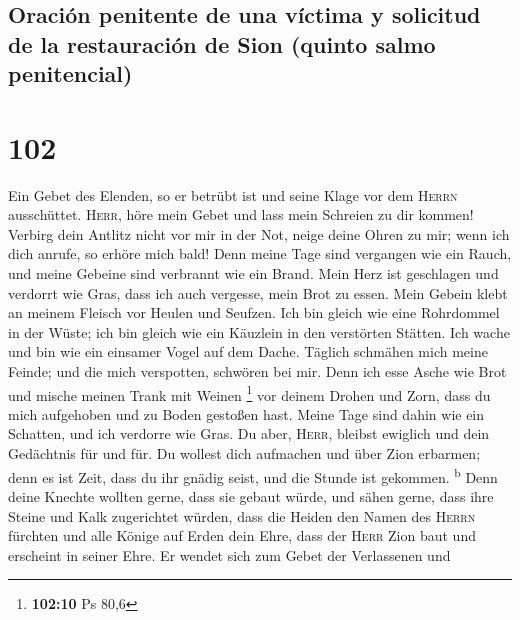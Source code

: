 \hypertarget{oraciuxf3n-penitente-de-una-vuxedctima-y-solicitud-de-la-restauraciuxf3n-de-sion-quinto-salmo-penitencial}{%
\subsection{Oración penitente de una víctima y solicitud de la
restauración de Sion (quinto salmo
penitencial)}\label{oraciuxf3n-penitente-de-una-vuxedctima-y-solicitud-de-la-restauraciuxf3n-de-sion-quinto-salmo-penitencial}}

\hypertarget{section-101}{%
\section{102}\label{section-101}}

 Ein Gebet des Elenden, so er betrübt ist und seine Klage
vor dem \textsc{Herrn} ausschüttet.  \textsc{Herr}, höre
mein Gebet und lass mein Schreien zu dir kommen!  Verbirg
dein Antlitz nicht vor mir in der Not, neige deine Ohren zu mir; wenn
ich dich anrufe, so erhöre mich bald!  Denn meine Tage
sind vergangen wie ein Rauch, und meine Gebeine sind verbrannt wie ein
Brand.  Mein Herz ist geschlagen und verdorrt wie Gras,
dass ich auch vergesse, mein Brot zu essen.  Mein Gebein
klebt an meinem Fleisch vor Heulen und Seufzen.  Ich bin
gleich wie eine Rohrdommel in der Wüste; ich bin gleich wie ein Käuzlein
in den verstörten Stätten.  Ich wache und bin wie ein
einsamer Vogel auf dem Dache.  Täglich schmähen mich meine
Feinde; und die mich verspotten, schwören bei mir.  Denn
ich esse Asche wie Brot und mische meinen Trank mit Weinen \footnote{\textbf{102:10}
  Ps 80,6}  vor deinem Drohen und Zorn, dass du mich
aufgehoben und zu Boden gestoßen hast.  Meine Tage sind
dahin wie ein Schatten, und ich verdorre wie Gras.  Du
aber, \textsc{Herr}, bleibst ewiglich und dein Gedächtnis für und für.
 Du wollest dich aufmachen und über Zion erbarmen; denn
es ist Zeit, dass du ihr gnädig seist, und die Stunde ist gekommen.
\textsuperscript{b}  Denn deine Knechte wollten gerne,
dass sie gebaut würde, und sähen gerne, dass ihre Steine und Kalk
zugerichtet würden,  dass die Heiden den Namen des
\textsc{Herrn} fürchten und alle Könige auf Erden dein Ehre,
 dass der \textsc{Herr} Zion baut und erscheint in seiner
Ehre.  Er wendet sich zum Gebet der Verlassenen und
